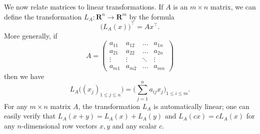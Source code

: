 \begin{additional corollary}\label{ac 6.1.1}
We now relate matrices to linear transformations.
If \(A\) is an \(m \times n\) matrix, we can define the transformation \(L_A : \mathbf{R}^n \to \mathbf{R}^m\) by the formula
\[
    \big(L_A(x)\big)^\top = Ax^\top.
\]
More generally, if
\[
    A = \begin{pmatrix}
        a_{11} & a_{12} & \dots  & a_{1n} \\
        a_{21} & a_{22} & \dots  & a_{2n} \\
        \vdots & \vdots & \ddots & \vdots \\
        a_{m1} & a_{m2} & \dots  & a_{mn}
    \end{pmatrix}
\]
then we have
\[
    L_A\big((x_j)_{1 \leq j \leq n}\big) = \bigg(\sum_{j = 1}^n a_{ij} x_j\bigg)_{1 \leq i \leq m}.
\]
For any \(m \times n\) matrix \(A\), the transformation \(L_A\) is automatically linear;
one can easily verify that \(L_A(x + y) = L_A(x) + L_A(y)\) and \(L_A(cx) = c L_A(x)\) for any \(n\)-dimensional row vectors \(x, y\) and any scalar \(c\).
\end{additional corollary}

